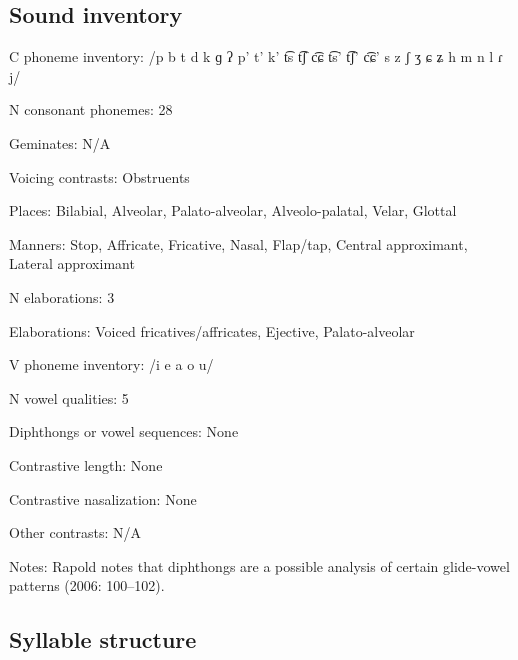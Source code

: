 {\subsection*{Sound inventory}
\begin{appendixdesc}

\item[C phoneme inventory:] /p b t d k ɡ ʔ p’ t’ k’ t͡s t͡ʃ c͡ɕ t͡s’ t͡ʃ’ c͡ɕ’ s z ʃ ʒ ɕ ʑ h m n l ɾ j/

\item[N consonant phonemes:] 28

\item[Geminates:] N/A

\item[Voicing contrasts:] Obstruents

\item[Places:] Bilabial, Alveolar, Palato-alveolar, Alveolo-palatal, Velar, Glottal

\item[Manners:] Stop, Affricate, Fricative, Nasal, Flap/tap, Central approximant, Lateral approximant

\item[N elaborations:] 3

\item[Elaborations:] Voiced fricatives/affricates, Ejective, Palato-alveolar

\item[V phoneme inventory:] /i e a o u/

\item[N vowel qualities:] 5

\item[Diphthongs or vowel sequences:] None

\item[Contrastive length:] None

\item[Contrastive nasalization:] None

\item[Other contrasts:] N/A

\item[Notes:] Rapold notes that diphthongs are a possible analysis of certain glide-vowel patterns (2006: 100--102).
\end{appendixdesc}
\subsection*{Syllable structure}
\begin{appendixdesc}


\end{appendixdesc}}
